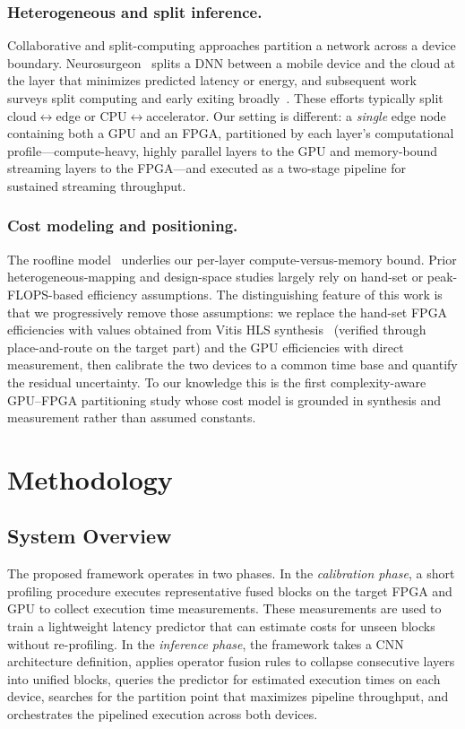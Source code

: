 \documentclass[runningheads]{llncs}
\begin{document}
\subsubsection{Heterogeneous and split inference.} Collaborative and split-computing approaches partition a network across a device boundary. Neurosurgeon~\cite{neurosurgeon2017} splits a DNN between a mobile device and the cloud at the layer that minimizes predicted latency or energy, and subsequent work surveys split computing and early exiting broadly~\cite{matsubara2022}. These efforts typically split cloud$\leftrightarrow$edge or CPU$\leftrightarrow$accelerator. Our setting is different: a \emph{single} edge node containing both a GPU and an FPGA, partitioned by each layer's computational profile---compute-heavy, highly parallel layers to the GPU and memory-bound streaming layers to the FPGA---and executed as a two-stage pipeline for sustained streaming throughput.

\subsubsection{Cost modeling and positioning.} The roofline model~\cite{roofline2009} underlies our per-layer compute-versus-memory bound. Prior heterogeneous-mapping and design-space studies largely rely on hand-set or peak-FLOPS-based efficiency assumptions. The distinguishing feature of this work is that we progressively remove those assumptions: we replace the hand-set FPGA efficiencies with values obtained from Vitis HLS synthesis~\cite{vitishls} (verified through place-and-route on the target part) and the GPU efficiencies with direct measurement, then calibrate the two devices to a common time base and quantify the residual uncertainty. To our knowledge this is the first complexity-aware GPU--FPGA partitioning study whose cost model is grounded in synthesis and measurement rather than assumed constants.

\section{Methodology}\label{sec:methodology}

\subsection{System Overview}\label{sec:system_overview}

The proposed framework operates in two phases. In the \textit{calibration phase}, a short profiling procedure executes representative fused blocks on the target FPGA and GPU to collect execution time measurements. These measurements are used to train a lightweight latency predictor that can estimate costs for unseen blocks without re-profiling. In the \textit{inference phase}, the framework takes a CNN architecture definition, applies operator fusion rules to collapse consecutive layers into unified blocks, queries the predictor for estimated execution times on each device, searches for the partition point that maximizes pipeline throughput, and orchestrates the pipelined execution across both devices.
\end{document}
